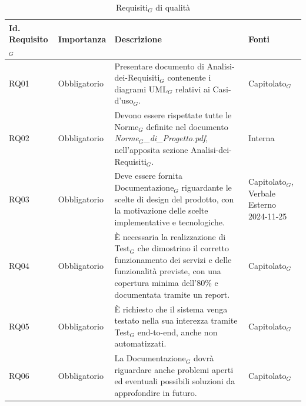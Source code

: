 \documentclass[11pt]{article}
\begin{document}
\begin{justify}
\begin{table}[H]
\centering
\renewcommand{\arraystretch}{1.5}
\begin{tabular}{|>{\centering\arraybackslash}m{2.7cm}|>{\centering\arraybackslash}m{2.7cm}|>{\centering\arraybackslash}m{6cm}|>{\centering\arraybackslash}m{2.1cm}|}
\hline
\textbf{Id. Requisito$_G$} & \textbf{Importanza} & \textbf{Descrizione} & \textbf{Fonti}\\
\hline
RQ01 & Obbligatorio & Presentare documento di Analisi-dei-Requisiti$_G$ contenente i diagrami UML$_G$ relativi ai Casi-d'uso$_G$. & Capitolato$_G$\\
\hline
RQ02 & Obbligatorio & Devono essere rispettate tutte le Norme$_G$ definite nel documento \textit{Norme$_G$\_di\_Progetto.pdf}, nell'apposita sezione Analisi-dei-Requisiti$_G$. & Interna\\
\hline
RQ03 & Obbligatorio & Deve essere fornita Documentazione$_G$ riguardante le scelte di design del prodotto, con la motivazione delle scelte implementative e tecnologiche. & Capitolato$_G$, Verbale Esterno 2024-11-25\\
\hline
RQ04 & Obbligatorio & È necessaria la realizzazione di Test$_G$ che dimostrino il corretto funzionamento dei servizi e delle funzionalità previste, con una copertura minima dell'80\% e documentata tramite un report.  & Capitolato$_G$\\
\hline
RQ05 & Obbligatorio & È richiesto che il sistema venga testato nella sua interezza tramite Test$_G$ end-to-end, anche non automatizzati.  & Capitolato$_G$\\
\hline
RQ06 & Obbligatorio & La Documentazione$_G$ dovrà riguardare anche problemi aperti ed eventuali possibili soluzioni da approfondire in futuro.  & Capitolato$_G$\\
\hline
\end{tabular}
\caption{Requisiti$_G$ di qualità}
\end{table}

\newpage

\end{justify}
\end{document}
